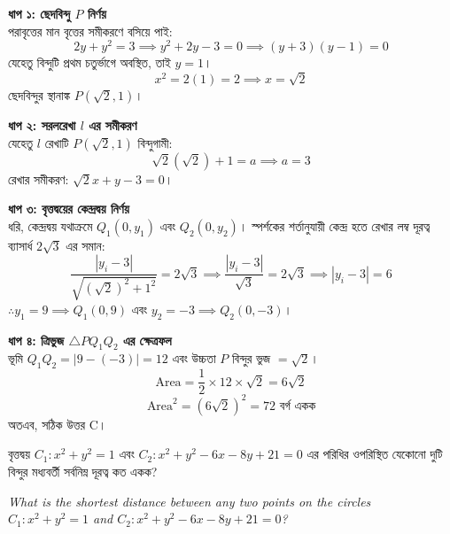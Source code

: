 \documentclass[12pt, a4paper]{article}
\begin{document}
\begin{tcolorbox}[solutionbox={সমাধান (Solution)}]
    \noindent
    \textbf{ধাপ ১: ছেদবিন্দু $P$ নির্ণয়} \\
    পরাবৃত্তের মান বৃত্তের সমীকরণে বসিয়ে পাই:
    \[ 2y + y^2 = 3 \implies y^2 + 2y - 3 = 0 \implies (y + 3)(y - 1) = 0 \]
    যেহেতু বিন্দুটি প্রথম চতুর্ভাগে অবস্থিত, তাই $y = 1$। 
    \[ x^2 = 2(1) = 2 \implies x = \sqrt{2} \]
    ছেদবিন্দুর স্থানাঙ্ক $P(\sqrt{2}, 1)$।
    
    \vspace{0.5em}
    \noindent\textbf{ধাপ ২: সরলরেখা $l$ এর সমীকরণ} \\
    যেহেতু $l$ রেখাটি $P(\sqrt{2}, 1)$ বিন্দুগামী:
    \[ \sqrt{2}(\sqrt{2}) + 1 = a \implies a = 3 \]
    রেখার সমীকরণ: $\sqrt{2}x + y - 3 = 0$।
    
    \vspace{0.5em}
    \noindent\textbf{ধাপ ৩: বৃত্তদ্বয়ের কেন্দ্রদ্বয় নির্ণয়} \\
    ধরি, কেন্দ্রদ্বয় যথাক্রমে $Q_1(0, y_1)$ এবং $Q_2(0, y_2)$। 
    স্পর্শকের শর্তানুযায়ী কেন্দ্র হতে রেখার লম্ব দূরত্ব ব্যাসার্ধ $2\sqrt{3}$ এর সমান:
    \[ \frac{|y_i - 3|}{\sqrt{(\sqrt{2})^2 + 1^2}} = 2\sqrt{3} \implies \frac{|y_i - 3|}{\sqrt{3}} = 2\sqrt{3} \implies |y_i - 3| = 6 \]
    $\therefore y_1 = 9 \implies Q_1(0, 9)$ এবং $y_2 = -3 \implies Q_2(0, -3)$।
    
    \vspace{0.5em}
    \noindent\textbf{ধাপ ৪: ত্রিভুজ $\triangle PQ_1Q_2$ এর ক্ষেত্রফল} \\
    ভূমি $Q_1Q_2 = |9 - (-3)| = 12$ এবং উচ্চতা $P$ বিন্দুর ভুজ $= \sqrt{2}$।
    \[ \text{Area} = \frac{1}{2} \times 12 \times \sqrt{2} = 6\sqrt{2} \]
    \[ \text{Area}^2 = (6\sqrt{2})^2 = 72 \text{ বর্গ একক} \]
    অতএব, সঠিক উত্তর C।
\end{tcolorbox}
\begin{tcolorbox}[questionbox={প্রশ্ন (Question) 50}]
    \noindent
    বৃত্তদ্বয় $C_1: x^2 + y^2 = 1$ এবং $C_2: x^2 + y^2 - 6x - 8y + 21 = 0$ এর পরিধির ওপরিস্থিত যেকোনো দুটি বিন্দুর মধ্যবর্তী সর্বনিম্ন দূরত্ব কত একক?
    
    \vspace{0.8em}
    \begin{english}
    \noindent\textit{\color{darkgray}
    What is the shortest distance between any two points on the circles $C_1: x^2 + y^2 = 1$ and $C_2: x^2 + y^2 - 6x - 8y + 21 = 0$?
    }
    \end{english}
\end{tcolorbox}
\end{document}
